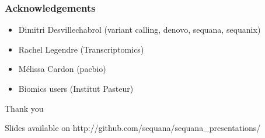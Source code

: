 \documentclass{beamer}
\begin{document}
    
    



\begin{frame}
 \frametitle{Acknowledgements}

 \begin{itemize}
  \item Dimitri Desvillechabrol (variant calling, denovo, sequana, sequanix)
  \item Rachel Legendre (Transcriptomics)
  \item M\'elissa Cardon (pacbio)
  \item Biomics users (Institut Pasteur)
 \end{itemize}
 
\end{frame}


\begin{frame}
\centering
\vspace{2cm}
\LARGE
 Thank you 
 
 \vspace{2cm}
 
 \small
 Slides available on http://github.com/sequana/sequana\_presentations/
\end{frame}
\end{document}
